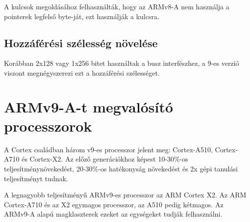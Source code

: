 A kulcsok megoldásához felhasználták, hogy az ARMv8-A nem használja a pointerek legfelső byte-ját, ezt használják a kulcsra.

\subsection{Hozzáférési szélesség növelése} 
Korábban 2x128 vagy 1x256 bitet használtak a busz interfészhez, a 9-es verzió viszont megnégyszerezi ezt a hozzáférési szélességet.

\section{ARMv9-A-t megvalósító processzorok}
A Cortex családban három v9-es processzor jelent meg: Cortex-A510, Cortex-A710 és Cortex-X2.
Az előző generációkhoz képest 10-30\%-os teljesítménynövekedést, 20-30\%-os hatékonyság növekedést és 2x gépi tanulási teljesítményt tudnak.

A legnagyobb teljesítményű ARMv9-es processzor az ARM Cortex X2.
Az ARM Cortex-A710 és az X2 egymagos processzor, az A510 pedig kétmagos.
Az ARMv9-A alapú magklaszterek ezeket az egységeket tudják felhasználni.